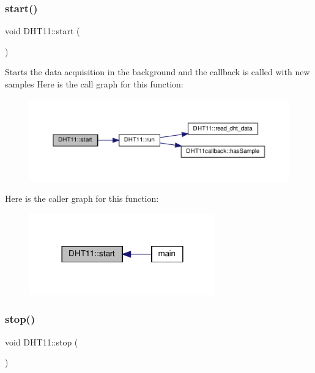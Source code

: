\subsubsection{\texorpdfstring{start()}{start()}}
{\footnotesize\ttfamily void D\+H\+T11\+::start (\begin{DoxyParamCaption}{ }\end{DoxyParamCaption})}

Starts the data acquisition in the background and the callback is called with new samples Here is the call graph for this function\+:
\nopagebreak
\begin{figure}[H]
\begin{center}
\leavevmode
\includegraphics[width=350pt]{classDHT11_a09a0c99de09f1849342d436624251f1d_cgraph}
\end{center}
\end{figure}
Here is the caller graph for this function\+:
\nopagebreak
\begin{figure}[H]
\begin{center}
\leavevmode
\includegraphics[width=228pt]{classDHT11_a09a0c99de09f1849342d436624251f1d_icgraph}
\end{center}
\end{figure}
\mbox{\label{classDHT11_a53188c041b8c49557d328f18ffbdacd7}} 
\subsubsection{\texorpdfstring{stop()}{stop()}}
{\footnotesize\ttfamily void D\+H\+T11\+::stop (\begin{DoxyParamCaption}{ }\end{DoxyParamCaption})}

